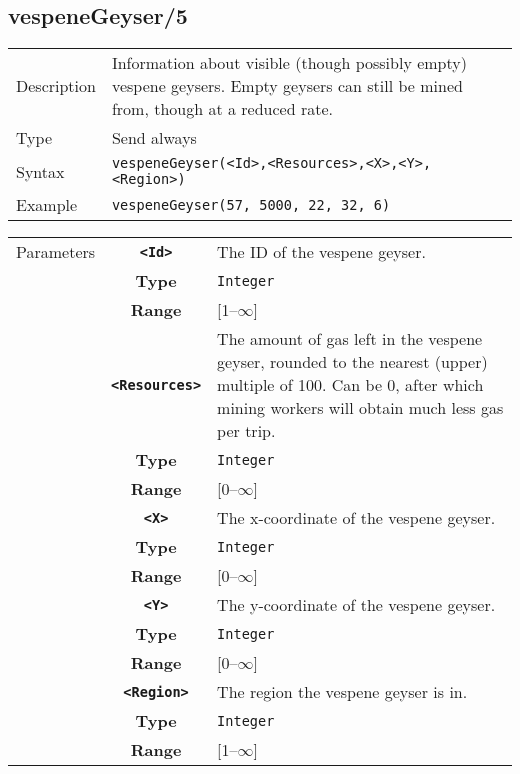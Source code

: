 \subsection{vespeneGeyser/5}
\begin{tabularx}{\textwidth}{lX}
 Description & Information about visible (though possibly empty) vespene geysers. Empty geysers can still be mined from, though at a reduced rate. \\
 Type & Send always \\
 Syntax & \verb|vespeneGeyser(<Id>,<Resources>,<X>,<Y>,<Region>)| \\
 Example & \verb|vespeneGeyser(57, 5000, 22, 32, 6)| \\
 \end{tabularx}
 \begin{tabularx}{\textwidth}{l | c | p{8cm}|}
 \cline{2-3}
 Parameters & \textbf{\verb|<Id>|} & The ID of the vespene geyser.\\
            & \textbf{Type} & \verb|Integer| \\
            & \textbf{Range} & [1--$\infty$] \\
            \cline{2-3}
            & \textbf{\verb|<Resources>|} & The amount of gas left in the vespene geyser, rounded to the nearest (upper) multiple of 100. Can be 0, after which mining workers will obtain much less gas per trip.\\
            & \textbf{Type} & \verb|Integer| \\
            & \textbf{Range} & [0--$\infty$] \\
            \cline{2-3}
            & \textbf{\verb|<X>|} & The x-coordinate of the vespene geyser.\\
            & \textbf{Type} & \verb|Integer| \\
            & \textbf{Range} & [0--$\infty$] \\
            \cline{2-3}
            & \textbf{\verb|<Y>|} & The y-coordinate of the vespene geyser.\\
            & \textbf{Type} & \verb|Integer| \\
            & \textbf{Range} & [0--$\infty$] \\
            \cline{2-3}
            & \textbf{\verb|<Region>|} & The region the vespene geyser is in.\\
            & \textbf{Type} & \verb|Integer| \\
            & \textbf{Range} & [1--$\infty$] \\
            \cline{2-3}
\end{tabularx}

